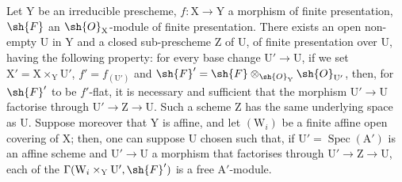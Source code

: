 \begin{proposition}[11.4.5]
\label{IV.11.4.5}
Let $\mathrm{Y}$ be an irreducible prescheme, $f:\mathrm{X}\to\mathrm{Y}$ a morphism of
finite presentation, $\sh{F}$ an $\sh{O}_\mathrm{X}$-module of finite presentation. There exists an open non-empty $\mathrm{U}$
in $\mathrm{Y}$ and a closed sub-prescheme $\mathrm{Z}$ of $\mathrm{U}$, of finite presentation over $\mathrm{U}$, having the following property:
for every base change $\mathrm{U}'\to\mathrm{U}$, if we set $\mathrm{X}'=\mathrm{X}\times_\mathrm{Y}\mathrm{U}'$, $f'=f_{(\mathrm{U}')}$ and $\sh{F}'=\sh{F}\otimes_{\sh{O}_\mathrm{Y}}\sh{O}_{\mathrm{U}'}$,
then, for $\sh{F}'$ to be $f'$-flat, it is necessary and sufficient that the morphism $\mathrm{U}'\to\mathrm{U}$ factorise
through $\mathrm{U}'\to\mathrm{Z}\to\mathrm{U}$. Such a scheme $\mathrm{Z}$ has the same underlying space as $\mathrm{U}$. Suppose moreover that $\mathrm{Y}$ is affine,
and let $(\mathrm{W}_i)$ be a finite affine open covering of $\mathrm{X}$; then, one can suppose $\mathrm{U}$ chosen
such that, if $\mathrm{U}'=\operatorname{Spec}(\mathrm{A}')$ is an affine scheme and $\mathrm{U}'\to\mathrm{U}$ a morphism that factorises
through $\mathrm{U}'\to\mathrm{Z}\to\mathrm{U}$, each of the $\Gamma(\mathrm{W}_i\times_\mathrm{Y}\mathrm{U}',\sh{F}')$ is a free $\mathrm{A}'$-module.
\end{proposition}

